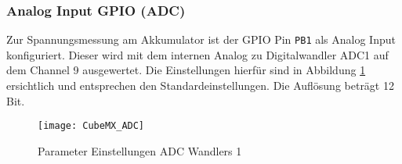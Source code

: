 \subsubsection{Analog Input GPIO (ADC)}
\label{sec:CubeMXADC}

Zur Spannungsmessung am Akkumulator ist der GPIO Pin \texttt{PB1} als Analog Input konfiguriert.
Dieser wird mit dem internen Analog zu Digitalwandler ADC1 auf dem Channel 9 ausgewertet.
Die Einstellungen hierfür sind in Abbildung \ref{pic:CubeMX_ADC} ersichtlich und entsprechen den Standardeinstellungen. Die Auflösung beträgt 12 Bit.

\begin{figure}[H]
	\centering
	\texttt{[image: CubeMX\_ADC]}
	\caption{Parameter Einstellungen ADC Wandlers 1}
	\label{pic:CubeMX_ADC}
\end{figure}


\newpage